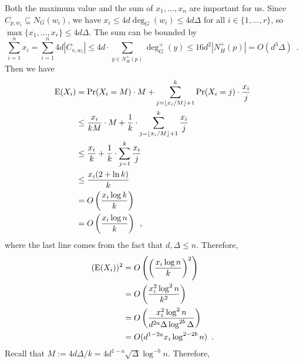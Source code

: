 \documentclass{patmorin}
\begin{document}
Both the maximum value and the sum of $x_1,\ldots,x_n$ are important for us.  Since $C_{p,w_i}\subseteq N_G(w_i)$, we have $x_i\le 4d\deg_G(w_i)\le 4d\Delta$ for all $i\in\{1,\ldots,r\}$, so $\max\{x_1,\ldots,x_r\}\le 4d\Delta$. The sum can be bounded by
\[
  \sum_{i=1}^n x_i
    = \sum_{i=1}^n 4d|C_{v,w_i}|
    \le 4d\cdot \sum_{y\in N^+_{H}(p)} \deg^+_{G}(y)
    \le 16d^2|N^+_{H}(p)|=O(d^3\Delta)
  \enspace .
\]
Then we have
\begin{align*}
  \mathrm{E}(X_i)
  & =\Pr(X_i=M)\cdot M + \sum_{j=\lfloor x_i/M\rfloor+1}^k \Pr(X_i=j)\cdot\frac{x_i}{j} \\
  & \le\frac{x_i}{kM}\cdot M + \frac{1}{k}\cdot\sum_{j=\lfloor x_i/M\rfloor+1}^k \frac{x_i}{j} \\
  & \le\frac{x_i}{k} + \frac{1}{k}\cdot\sum_{j=1}^k \frac{x_i}{j} \\
  & \le \frac{x_i(2+\ln k)}{k} \\
  & = O\left(\frac{x_i\log k}{k}\right) \\
  & = O\left(\frac{x_i\log n}{k}\right)
  \enspace ,
\end{align*}
where the last line comes from the fact that $d,\Delta \le n$.
Therefore,
\begin{align*}
  (\mathrm{E}(X_i))^2
  & = O\left(\left(\frac{x_i\log n}{k}\right)^2\right) \\
  & = O\left(\frac{x_i^2\log^2 n}{k^2}\right) \\
  & = O\left(\frac{x_i^2\log^2 n}{d^{2a}\Delta\log^{2b}\Delta}\right) \\
  & = O(d^{1-2a}x_i\log^{2-2b} n) \enspace .
\end{align*}
Recall that $M:=4d\Delta/k=4d^{1-a}\sqrt{\Delta}\log^{-b}n$. Therefore,
\end{document}
